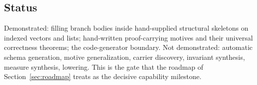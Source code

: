 \subsection{Status}

Demonstrated: filling branch bodies inside hand-supplied structural skeletons on indexed vectors and lists; hand-written proof-carrying motives and their universal correctness theorems; the code-generator boundary. Not demonstrated: automatic schema generation, motive generalization, carrier discovery, invariant synthesis, measure synthesis, lowering. This is the gate that the roadmap of Section~\ref{sec:roadmap} treats as the decisive capability milestone.
